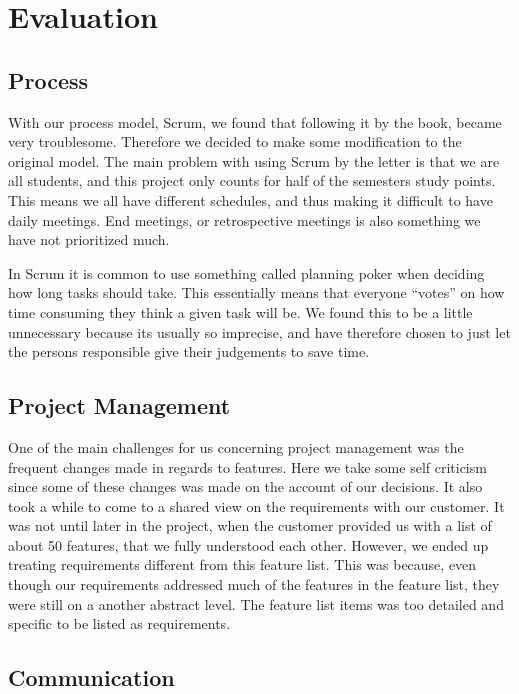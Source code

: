 \section{Evaluation}
\thispagestyle{plain}
	\subsection{Process}

With our process model, Scrum, we found that following it by the book, became very troublesome. Therefore we decided to make some modification to the original model. The main problem with using Scrum by the letter is that we are all students, and this project only counts for half of the semesters study points. This means we all have different schedules, and thus making it difficult to have daily meetings. End meetings, or retrospective meetings is also something we have not prioritized much.

In Scrum it is common to use something called planning poker when deciding how long tasks should take. This essentially means that everyone “votes” on how time consuming they think a given task will be. We found this to be a little unnecessary because its usually so imprecise, and have therefore chosen to just let the persons responsible give their judgements to save time. 

	\subsection{Project Management}

One of the main challenges for us concerning project management was the frequent changes made in regards to features. Here we take some self criticism since some of these changes was made on the account of our decisions. It also took a while to come to a shared view on the requirements with our customer. It was not until later in the project, when the customer provided us with a list of about 50 features, that we fully understood each other. However, we ended up treating requirements different from this feature list. This was because, even though our requirements addressed much of the features in the feature list, they were still on a another abstract level. The feature list items was too detailed and specific to be listed as requirements.

	\subsection{Communication}

